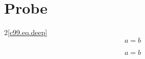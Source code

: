 \chapter{Probe}\label{c99}
\num[c99.cl.1]{2}{\ref{c99.eq.deep}}
\begin{equation}\label{c99.eq.core}a=b\end{equation}
\begin{vertiefung}[id=c99.v1,titel={T},wozu={W},voraussetzung={V},zurueck={Z}]
\begin{equation}\label{c99.eq.deep}a=b\end{equation}
\end{vertiefung}
